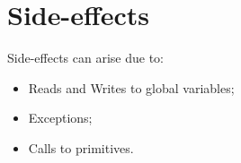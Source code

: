 \documentclass{book}
\begin{document}

\chapter{Side-effects}

Side-effects can arise due to:
\begin{itemize}
\item Reads and Writes to global variables;
\item Exceptions;
\item Calls to primitives.
\end{itemize}



\end{document}
